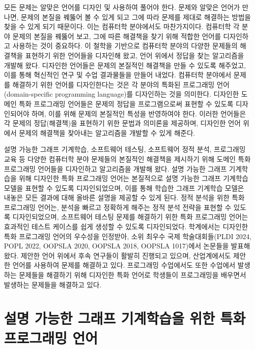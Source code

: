 \documentclass[11pt]{article}
\begin{document}
\begin{spacing}{1.145}
모든 문제는 알맞은 언어를 디자인 및 사용하여 풀어야 한다.
%
문제와 알맞은 언어가 만나면, 문제의 본질을 꿰뚫어 볼 수 있게 되고 그에 따라 문제를 제대로 해결하는 방법을 찾을 수 있게 되기 때문이다.
%
이는 컴퓨터학 분야에서도 마찬가지이다.
%
컴퓨터학 각 분야 문제의 본질을 꿰뚫어 보고, 그에 따른 해결책을 찾기 위해 적합한 언어를 디자인하고 사용하는 것이 중요하다.
%
이 철학을 기반으로 컴퓨터학 분야의 다양한 문제들의 해결책을 표현하기 위한 언어들을 디자인해 왔고, 언어 위에서 정답을 찾는 알고리즘을 개발해 왔다.
%
디자인한 언어들은 문제의 본질적인 해결책을 만들 수 있도록 해주었고, 이를 통해 혁신적인 연구 및 수업 결과물들을 만들어 내었다.
%
컴퓨터학 분야에서 문제를 해결하기 위한 언어를 디자인한다는 것은 각 분야의 특화된 프로그래밍 언어(domain-specific programming language)를 디자인하는 것을 의미한다.
%
디자인한 도메인 특화 프로그래밍 언어들은 문제의 정답을 프로그램으로써 표현할 수 있도록 디자인되어야 하며, 이를 위해 문제의 본질적인 특성을 반영하여야 한다.
%
이러한 언어들은 각 문제의 정답(해결책)을 표현하기 위한 문법과 의미론을 제공하며, 디자인한 언어 위에서 문제의 해결책을 찾아내는 알고리즘을 개발할 수 있게 해준다.
    


설명 가능한 그래프 기계학습, 소프트웨어 테스팅, 소프트웨어 정적 분석, 프로그래밍 교육 등 다양한 컴퓨터학 분야 문제들의 본질적인 해결책을 제시하기 위해 도메인 특화 프로그래밍 언어들을 디자인하고 알고리즘을 개발해 왔다.
%
설명 가능한 그래프 기계학습을 위해 디자인한 특화 프로그래밍 언어는 본질적으로 설명 가능한 그래프 기계학습 모델을 표현할 수 있도록 디자인되었으며, 이를 통해 학습한 그래프 기계학습 모델은 내놓은 모든 결과에 대해 올바른 설명을 제공할 수 있게 된다.
%
정적 분석을 위한 특화 프로그래밍 언어는, 분석을 빠르고 정확하게 해주는 정적 분석 전략을 표현할 수 있도록 디자인되었으며, 소프트웨어 테스팅 문제를 해결하기 위한 특화 프로그래밍 언어는 효과적인 테스트 케이스를 쉽게 생성할 수 있도록 디자인되었다.
%
학계에서는 디자인한 특화 프로그래밍 언어의 우수성을 인정받아, 소위 최우수 국제 학술대회들(PLDI 2024, POPL 2022, OOPSLA 2020, OOPSLA 2018, OOPSLA 1017)에서 논문들을 발표해 왔다.
%
제안한 언어 위에서 후속 연구들이 활발히 진행되고 있으며, 산업계에서도 제안한 언어를 사용하여 문제를 해결하고 있다.
%
프로그래밍 수업에서도 또한 수업에서 발생하는 문제들을 해결하기 위해 디자인한 특화 언어로 학생들이 프로그래밍을 배우면서 발생하는 문제들을 해결하고 있다.





\section{설명 가능한 그래프 기계학습을 위한 특화 프로그래밍 언어}


\end{spacing}
\end{document}

